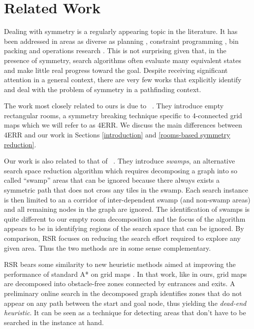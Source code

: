 \section{Related Work}
Dealing with symmetry is a regularly appearing topic in the literature.
It has been addressed in areas as diverse as planning \cite{}, constraint programming
\cite{}, bin packing \cite{} and operations research \cite{}.
This is not surprising given that, in the presence of symmetry, search algorithms 
often evaluate many equivalent states and make little 
real progress toward the goal.  
Despite receiving significant attention in a general context, there are very few
works that explicitly identify and deal with the problem of symmetry in a 
pathfinding context.
\par
The work most closely related to ours is due to
\citeauthor{harabor10}~. 
They introduce empty rectangular rooms,
a symmetry breaking technique specific to 4-connected grid maps
which we will refer to as 4ERR.
We discuss the main differences between 4ERR and our work in 
Sections \ref{introduction} and \ref{rooms-based symmetry reduction}.
\par
Our work is also related to that of \citeauthor{pochter10}~. 
They introduce \emph{swamps}, an alternative search space reduction algorithm
which requires decomposing a graph into so called ``swamp'' areas that can be 
ignored because there always exists a symmetric path that does not cross any 
tiles in the swamp. 
Each search instance is then limited to an a corridor of inter-dependent 
swamp (and non-swamp areas) and all remaining nodes in the graph are ignored.
The identification of swamps is quite different to our empty room decomposition
and the focus of the algorithm appears to be in identifying regions of the
search space that can be ignored.
By comparison, RSR focuses on reducing the search effort required to explore
any given area.
Thus the two methods are in some sense complementary.
\par
RSR bears some similarity to new heuristic methods aimed at improving the 
performance of standard A* on grid maps \cite{bjornsson06}.
In that work, like in ours, grid maps are decomposed into obstacle-free zones connected by entrances 
and exits.
A preliminary online search in the decomposed graph identifies zones that do not appear 
on any path between the start and goal node, thus yielding the \emph{dead-end heuristic}.
It can be seen as a technique for detecting areas that don't have to be searched
in the instance at hand.

